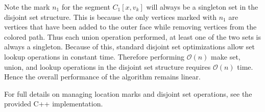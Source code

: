 \documentclass[letterpaper, 12pt]{article}
\theoremstyle{definition}
\theoremstyle{definition}
\theoremstyle{thm}
\theoremstyle{definition}
\begin{document}
Note the
mark $n_1$ for the segment $C_1[x,v_k]$ will always be a singleton set in the
disjoint set structure. This is because the only vertices marked with $n_1$ are
vertices that have been added to the outer face while removing vertices from the
colored path. Thus each union operation performed, at least one of the two sets
is always a singleton. Because of this, standard disjoint set optimizations
allow set lookup operations in constant time. Therefore performing
$\mathcal{O}(n)$ make set, union, and lookup operations in the disjoint set
structure requires $\mathcal{O}(n)$ time. Hence the overall performance of the
algorithm remains linear.

For full details on managing location marks and disjoint set operations, see the
provided C++ implementation.

\begin{comment}

\begin{figure}
\begin{tikzpicture}[scale=0.7]
	\node (1) [label=left:{$1,2$}] at (-3.0cm, 1.0cm) {};
	\node (2) [label=above left:{$1,3$}] at (-1.5cm, 2.0cm) {};
	\node (3) [label=above:{$1,4$}] at (0.0cm, 2.0cm) {};
	\node (4) [label=above right:{$1,3$}] at (1.5cm, 2.0cm) {};
	\node (5) [label=right:{$1,2$}] at (3.0cm, 1.0cm) {};
	\node (6) [label=right:{$1,4$}] at (3.0cm, -1.0cm) {};
	\node (7) [label=below:{$3,4$}] at (1.5cm, -2.0cm) {};
	\node (8) [label=below:{$2 \ y$}] at (0.0cm, -2.0cm) {};
	\node (9) [label=below:{$1,3$}] at (-1.5cm, -2.0cm) {};
	\node (10) [label=left:{$1 \ x$}, ultra thick, fill=white] at (-3.0cm, -1.0cm) {};
	\node (11) [label=right:{$1,2,3$}] at (-1.6cm, 0.4cm) {};
	\node (12) [label=left:{$1,3,4$}] at (1.6cm, -0.8cm) {};
	
	\draw (1) edge (2); \draw (2) edge (3); \draw (3) edge (4);
	\draw (4) edge (5); \draw (5) edge (6); \draw (6) edge (7);
	\draw (7) edge (8); \draw (8) edge (9); \draw (9) edge (10) [ultra thick];
	\draw (10) edge (1);
	
	\draw (2) edge (11); \draw (3) edge (11); \draw (3) edge (6);
	\draw (4) edge (6); \draw (3) edge (8); \draw (7) edge (12);
	\draw (8) edge (11); \draw (9) edge (11); \draw (10) edge (11);
	\draw (10) edge (2); \draw (3) edge (12); \draw (6) edge (12);
	\draw (8) edge (12);
\end{tikzpicture}
\begin{tikzpicture}[scale=0.7]
	\node (1) [label=left:{$1,2$}] at (-3.0cm, 1.0cm) {};
	\node (2) [label=above left:{$1,3$}] at (-1.5cm, 2.0cm) {};
	\node (3) [label=above:{$1,4$}] at (0.0cm, 2.0cm) {};
	\node (4) [label=above right:{$1,3$}] at (1.5cm, 2.0cm) {};
	\node (5) [label=right:{$1,2$}] at (3.0cm, 1.0cm) {};
	\node (6) [label=right:{$1,4$}] at (3.0cm, -1.0cm) {};
	\node (7) [label=below:{$3,4$}] at (1.5cm, -2.0cm) {};
	\node (8) [label=below:{$2 \ y$}] at (0.0cm, -2.0cm) {};
	\node (9) [label=below:{$1,3$}] at (-1.5cm, -2.0cm) {};
	\node (10) [label=left:{$1 \ x$}, ultra thick, fill=white] at (-3.0cm, -1.0cm) {};
	\node (11) [label=right:{$1,2,3$}] at (-1.6cm, 0.4cm) {};
	\node (12) [label=left:{$1,3,4$}] at (1.6cm, -0.8cm) {};
	

\end{comment}
\end{document}
